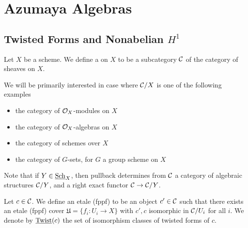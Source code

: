 \section{Azumaya Algebras}
\subsection{Twisted Forms and Nonabelian $H^1$}
\begin{defn}
Let $X$ be a scheme.  We define a  on $X$ to be a subcategory $\mathcal{C}$ of the category of sheaves on $X$.
\end{defn}
We will be primarily interested in case where $\mathcal{C}/X$ is one of the following examples
\begin{itemize}
\item the category of $\mathcal{O}_X$-modules on $X$
\item the category of $\mathcal{O}_X$-algebras on $X$
\item the category of schemes over $X$
\item the category of $G$-sets, for $G$ a group scheme on $X$
\end{itemize}
Note that if $Y\in \textnormal{\underline{Sch}}_X$, then pullback determines from $\mathcal{C}$ a category of algebraic structures $\mathcal{C}/Y$, and a right exact functor $\mathcal{C}\rightarrow\mathcal{C}/Y$.
\begin{defn}
Let $c\in \mathcal{C}$.  We define an etale (fppf)  to be an object $c'\in \mathcal{C}$ such that there exists an etale (fppf) cover $\mathfrak U = \{f_i: U_i\rightarrow X\}$ with $c',c$ isomorphic in $\mathcal{C}/U_i$ for all $i$.  We denote by $\textnormal{\underline{Twist}}(c)$ the set of isomorphism classes of twisted forms of $c$.
\end{defn}

